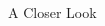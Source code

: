 \documentclass[final,t]{beamer}
\begin{document}
\begin{frame}{}
\begin{columns}[t]
\begin{column}{.34\linewidth}
\begin{block}{A Closer Look}

\end{block}
\end{column}
\end{columns}
\end{frame}
\end{document}

